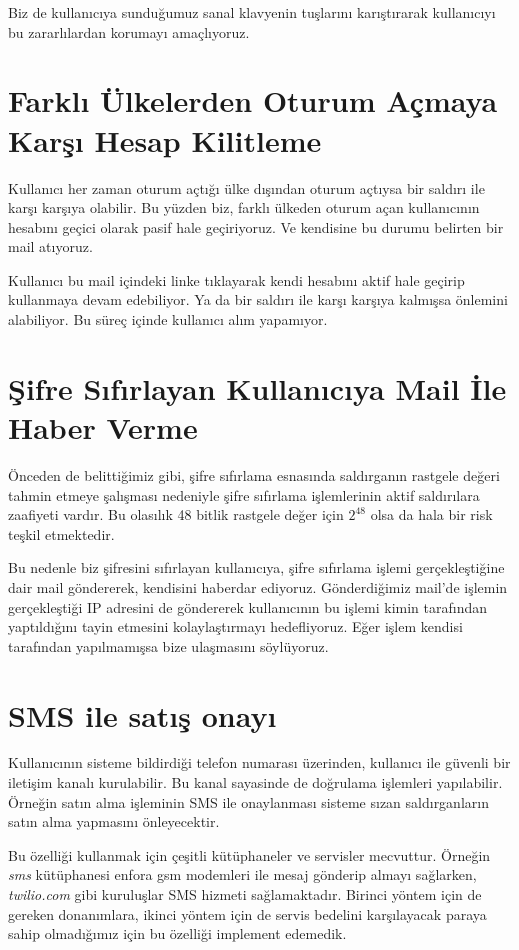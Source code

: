 \documentclass[11pt,a4paper]{report}
\begin{document}
Biz de kullanıcıya sunduğumuz sanal klavyenin tuşlarını karıştırarak kullanıcıyı bu zararlılardan korumayı amaçlıyoruz.

\section{Farklı Ülkelerden Oturum Açmaya Karşı Hesap Kilitleme}
Kullanıcı her zaman oturum açtığı ülke dışından oturum açtıysa bir saldırı ile karşı karşıya olabilir. Bu yüzden biz, farklı ülkeden oturum açan kullanıcının hesabını geçici olarak pasif hale geçiriyoruz. Ve kendisine bu durumu belirten bir mail atıyoruz.

Kullanıcı bu mail içindeki linke tıklayarak kendi hesabını aktif hale geçirip kullanmaya devam edebiliyor. Ya da bir saldırı ile karşı karşıya kalmışsa önlemini alabiliyor. Bu süreç içinde kullanıcı alım yapamıyor.

\section{Şifre Sıfırlayan Kullanıcıya Mail İle Haber Verme}
Önceden de belittiğimiz gibi, şifre sıfırlama esnasında saldırganın rastgele değeri tahmin etmeye şalışması nedeniyle şifre sıfırlama işlemlerinin aktif saldırılara zaafiyeti vardır. Bu olasılık 48 bitlik rastgele değer için $2^{48}$ olsa da hala bir risk teşkil etmektedir.

Bu nedenle biz şifresini sıfırlayan kullanıcıya, şifre sıfırlama işlemi gerçekleştiğine dair mail göndererek, kendisini haberdar ediyoruz. Gönderdiğimiz mail'de işlemin gerçekleştiği IP adresini de göndererek kullanıcının bu işlemi kimin tarafından yaptıldığını tayin etmesini kolaylaştırmayı hedefliyoruz. Eğer işlem kendisi tarafından yapılmamışsa bize ulaşmasını söylüyoruz.

\section{SMS ile satış onayı}
Kullanıcının sisteme bildirdiği telefon numarası üzerinden, kullanıcı ile güvenli bir iletişim kanalı kurulabilir. Bu kanal sayasinde de doğrulama işlemleri yapılabilir. Örneğin satın alma işleminin SMS ile onaylanması sisteme sızan saldırganların satın alma yapmasını önleyecektir.

Bu özelliği kullanmak için çeşitli kütüphaneler ve servisler mecvuttur. Örneğin \emph{sms} kütüphanesi enfora gsm modemleri ile mesaj gönderip almayı sağlarken, \emph{twilio.com} gibi kuruluşlar SMS hizmeti sağlamaktadır. Birinci yöntem için de gereken donanımlara, ikinci yöntem için de servis bedelini karşılayacak paraya sahip olmadığımız için bu özelliği implement edemedik.
\end{document}
